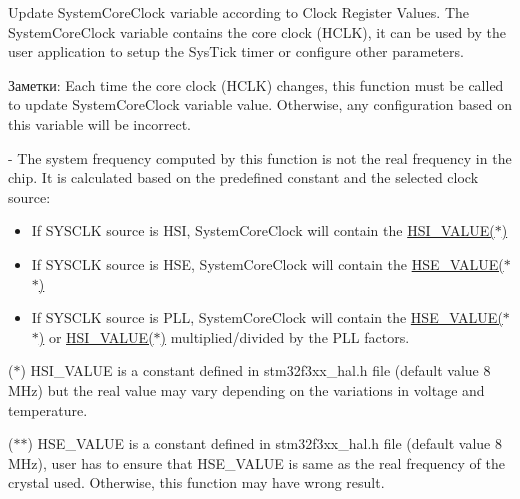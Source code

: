 Update SystemCoreClock variable according to Clock Register Values. The SystemCoreClock variable contains the core clock (HCLK), it can be used by the user application to setup the SysTick timer or configure other parameters. 

\begin{Desc}
\item[Заметки:]Each time the core clock (HCLK) changes, this function must be called to update SystemCoreClock variable value. Otherwise, any configuration based on this variable will be incorrect.

- The system frequency computed by this function is not the real frequency in the chip. It is calculated based on the predefined constant and the selected clock source:\end{Desc}
\begin{itemize}
\item If SYSCLK source is HSI, SystemCoreClock will contain the \hyperlink{group___s_t_m32_f3xx___system___private___defines_gaa8c76e274d0f6dd2cefb5d0b17fbc37}{HSI\_\-VALUE($\ast$)}\end{itemize}


\begin{itemize}
\item If SYSCLK source is HSE, SystemCoreClock will contain the \hyperlink{group___s_t_m32_f3xx___system___private___defines_geafcff4f57440c60e64812dddd13e7cb}{HSE\_\-VALUE($\ast$$\ast$)}\end{itemize}


\begin{itemize}
\item If SYSCLK source is PLL, SystemCoreClock will contain the \hyperlink{group___s_t_m32_f3xx___system___private___defines_geafcff4f57440c60e64812dddd13e7cb}{HSE\_\-VALUE($\ast$$\ast$)} or \hyperlink{group___s_t_m32_f3xx___system___private___defines_gaa8c76e274d0f6dd2cefb5d0b17fbc37}{HSI\_\-VALUE($\ast$)} multiplied/divided by the PLL factors.\end{itemize}


($\ast$) HSI\_\-VALUE is a constant defined in stm32f3xx\_\-hal.h file (default value 8 MHz) but the real value may vary depending on the variations in voltage and temperature.

($\ast$$\ast$) HSE\_\-VALUE is a constant defined in stm32f3xx\_\-hal.h file (default value 8 MHz), user has to ensure that HSE\_\-VALUE is same as the real frequency of the crystal used. Otherwise, this function may have wrong result.

